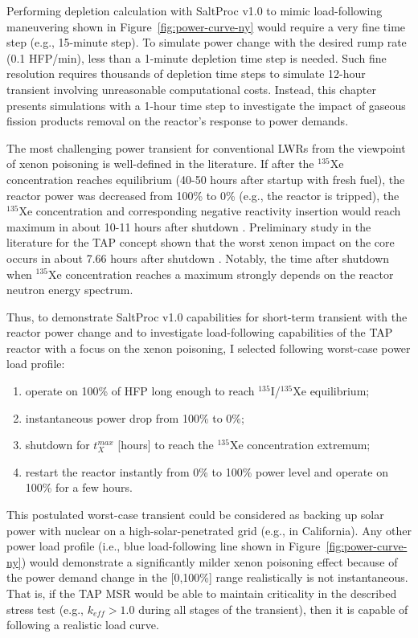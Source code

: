 Performing depletion calculation with SaltProc v1.0 to mimic load-following 
maneuvering shown in Figure~\ref{fig:power-curve-ny} would require a very fine 
time step (e.g., 15-minute step). To simulate power change with the desired 
rump rate (0.1 \gls{HFP}/min), less than a 1-minute depletion time step is 
needed. 
Such fine resolution requires thousands of depletion time steps to simulate 
12-hour transient involving unreasonable computational costs. 
Instead, this chapter presents simulations with a 1-hour time step to 
investigate the impact of gaseous fission products removal on the reactor's 
response to power demands. 

The most challenging power transient for conventional \glspl{LWR} from the 
viewpoint of xenon poisoning is well-defined in the literature. If after the 
$^{135}$Xe concentration reaches equilibrium (40-50 hours after startup with 
fresh fuel), the reactor power was decreased from 100\% to 0\% (e.g., the 
reactor is tripped), the $^{135}$Xe concentration and corresponding negative 
reactivity insertion would reach maximum in about 10-11 hours after shutdown 
\cite{lamarsh_introduction_1975, 
bell_nuclear_1970}. Preliminary study in the literature for the \gls{TAP} 
concept shown that the worst xenon impact on the core occurs in about 7.66 
hours after shutdown \cite{rykhlevskii_impact_2019}. Notably, the time after 
shutdown when $^{135}$Xe concentration reaches a maximum strongly depends on 
the reactor neutron energy spectrum.

Thus, to demonstrate SaltProc v1.0 capabilities for short-term transient with 
the reactor power change and to investigate load-following capabilities of the 
\gls{TAP} reactor with a focus on the xenon poisoning, I selected following 
worst-case power load profile:
\begin{enumerate}[label=(\alph*), noitemsep, topsep=0pt]
	\item operate on 100\% of \gls{HFP} long enough to reach 
	$^{135}$I/$^{135}$Xe equilibrium;
	\item instantaneous power drop from 100\% to 0\%;
	\item shutdown for $t^{max}_X$ [hours] to reach the $^{135}$Xe 
	concentration extremum;
	\item restart the reactor instantly from 0\% to 100\% power level and 
	operate on 100\% for a few hours.
\end{enumerate}
This postulated worst-case transient could be considered as backing up solar 
power with 
nuclear on a high-solar-penetrated grid (e.g., in California).
Any other power load profile (i.e., blue load-following line shown in  
Figure~\ref{fig:power-curve-ny}) would demonstrate a significantly milder 
xenon poisoning effect because of the power demand change in the [0,100\%] 
range realistically is not instantaneous. That is, if the \gls{TAP} \gls{MSR} 
would be able to maintain criticality in the described stress test (e.g., 
$k_{eff}>1.0$ during all stages of the transient), then it is capable of 
following a realistic load curve.

